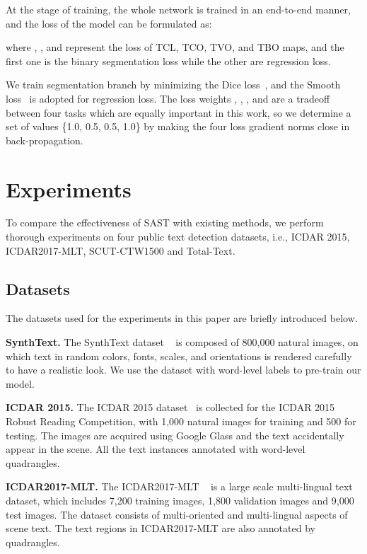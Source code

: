 \documentclass[sigconf]{acmart}
\begin{document}
At the stage of training, the whole network is trained in an end-to-end manner, and the loss of the model can be formulated as:

where , , and  represent the loss of TCL, TCO, TVO, and TBO maps, and the first one is the binary segmentation loss while the other are regression loss.




We train segmentation branch by minimizing the Dice loss~\cite{milletari2016v}, and the Smooth  loss~\cite{fastrcnn} is adopted for regression loss. The loss weights , , , and  are a tradeoff between four tasks which are equally important in this work, so we determine a set of values \{1.0, 0.5, 0.5, 1.0\} by making the four loss gradient norms close in back-propagation. 





\section{Experiments}

To compare the effectiveness of SAST with existing methods, we perform thorough experiments on four public text detection datasets, i.e., ICDAR 2015, ICDAR2017-MLT, SCUT-CTW1500 and Total-Text. 

\subsection{Datasets}
The datasets used for the experiments in this paper are briefly introduced below.

\textbf{SynthText.} The SynthText dataset ~\cite{gupta2016synthetic} is composed of 800,000 natural images, on which text in random colors, fonts, scales, and orientations is rendered carefully to have a realistic look. We use the dataset with word-level labels to pre-train our model.

\textbf{ICDAR 2015.} The ICDAR 2015 dataset~\cite{karatzas2015icdar} is collected for the ICDAR 2015 Robust Reading Competition, with 1,000 natural images for training and 500 for testing. The images are acquired using Google Glass and the text accidentally appear in the scene. All the text instances annotated with word-level quadrangles.

\textbf{ICDAR2017-MLT.} The ICDAR2017-MLT ~\cite{nayef2017icdar2017} is a large scale multi-lingual text dataset, which includes 7,200 training images, 1,800 validation images and 9,000 test images. The dataset consists of multi-oriented and multi-lingual aspects of scene text. The text regions in ICDAR2017-MLT are also annotated by quadrangles.
\end{document}
